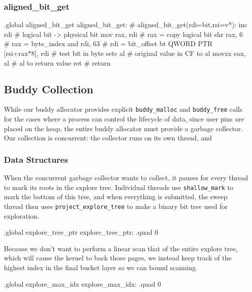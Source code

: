 \subsubsection{aligned\_bit\_get}

\begin{asm}
.global aligned_bit_get
aligned_bit_get:			    # aligned_bit_get(rdi=bit,rsi=v*):
	inc	rdi			    #   logical bit -> physical bit
	mov	rax, rdi		    #   rax = copy logical bit
	shr	rax, 6			    #   rax = byte_index
	and	rdi, 63			    #   rdi = bit_offset
	bt	QWORD PTR [rsi+rax*8], rdi  #   test bit in byte
	setc	al			    #   original value in CF to al
	movzx	eax, al			    #   al to return value
	ret				    #   return
\end{asm}


\subsection{Buddy Collection}

While our buddy allocator provides explicit \lstinline|buddy_malloc| and
\lstinline|buddy_free| calls for the cases where a process can control the
lifecycle of data, since user pins are placed on the heap, the entire buddy
allocator must provide a garbage collector. Our collection is concurrent: the
collector runs on its own thread, and 

\subsubsection{Data Structures}

When the concurrent garbage collector wants to collect, it pauses for every
thread to mark its roots in the explore tree. Individual threads use
\lstinline|shallow_mark| to mark the bottom of this tree, and when everything
is submitted, the sweep thread then uses \lstinline|project_explore_tree| to
make a binary bit tree used for exploration.

\begin{asmdata}
.global explore_tree_ptr
explore_tree_ptr: .quad 0
\end{asmdata}

Because we don't want to perform a linear scan that of the entire explore tree,
which will cause the kernel to back those pages, we instead keep track of the
highest index in the final bucket layer so we can bound scanning.

\begin{asmdata}
.global explore_max_idx
explore_max_idx: .quad 0
\end{asmdata}

